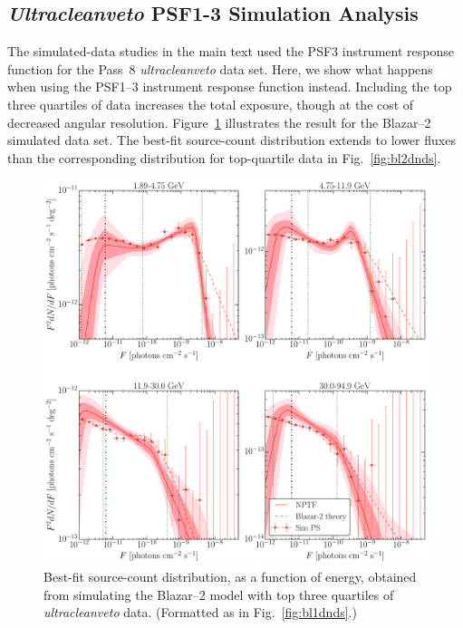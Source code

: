 \clearpage
\subsection{{\it Ultracleanveto} PSF1-3 Simulation Analysis}
\label{app:ucvsims}

The simulated-data studies in the main text used the PSF3 instrument response function for the Pass~8 {\it ultracleanveto} data set.  Here, we show what happens when using the PSF1--3 instrument response function instead.  Including the top three quartiles of data increases the total exposure, though at the cost of decreased angular resolution.  Figure~\ref{fig:dndsb2UCV} illustrates the result for the Blazar--2 simulated data set.  The best-fit source-count distribution extends to lower fluxes than the corresponding distribution for top-quartile data in Fig.~\ref{fig:bl2dnds}. 

\begin{figure}[b] %
   \centering
   \includegraphics[width=\textwidth]{ch-igrb/plots/bl2-ucv-dnds.pdf} 
   \caption{Best-fit source-count distribution, as a function of energy, obtained from simulating the Blazar--2 model with top three quartiles of \emph{ultracleanveto} data.  (Formatted as in Fig.~\ref{fig:bl1dnds}.)}
   \label{fig:dndsb2UCV}
\end{figure}



